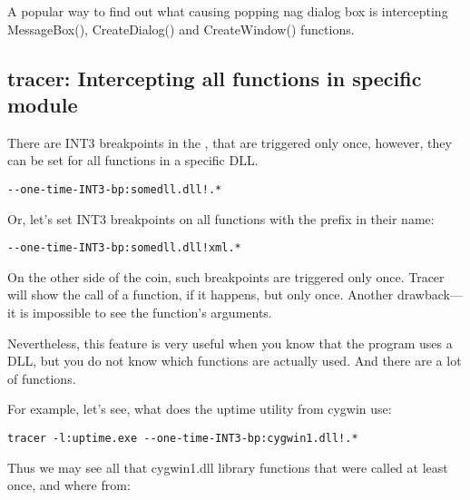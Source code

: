 A popular way to find out what causing popping nag dialog box is intercepting MessageBox(), 
CreateDialog() and CreateWindow() functions.

\subsection{tracer: Intercepting all functions in specific module}

There are INT3 breakpoints in the \tracer, that are triggered only once, however, they can be set for all functions
in a specific DLL.

\begin{lstlisting}
--one-time-INT3-bp:somedll.dll!.*
\end{lstlisting}

Or, let's set INT3 breakpoints on all functions with the  prefix in their name:

\begin{lstlisting}
--one-time-INT3-bp:somedll.dll!xml.*
\end{lstlisting}

On the other side of the coin, such breakpoints are triggered only once.
Tracer will show the call of a function, if it happens, but only once.
Another drawback---it is impossible to see the function's arguments.

Nevertheless, this feature is very useful when you know that the program uses a DLL,
but you do not know which functions are actually used.
And there are a lot of functions. 

\par
{}
For example, let's see, what does the uptime utility from cygwin use:

\begin{lstlisting}
tracer -l:uptime.exe --one-time-INT3-bp:cygwin1.dll!.*
\end{lstlisting}

Thus we may see all that cygwin1.dll library functions that were called at least once, and where from:



